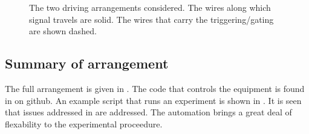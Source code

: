 \begin{centering}
\begin{figure}[h]%
   \hspace{.3in}
   \caption{
     The two driving arrangements considered.
     The wires along which signal travels are solid.
     The wires that carry the triggering/gating are shown dashed.
   }
   \label{fig:arrangements}
\end{figure}
\end{centering}





\subsection{Summary of arrangement}
The full arrangement is given in .
The code that controls the equipment is found in on github.
An example script that runs an experiment is shown in \coderef{}.
It is seen that issues addressed in \secref{} are addressed.
The automation brings a great deal of flexability to the experimental proceedure.

